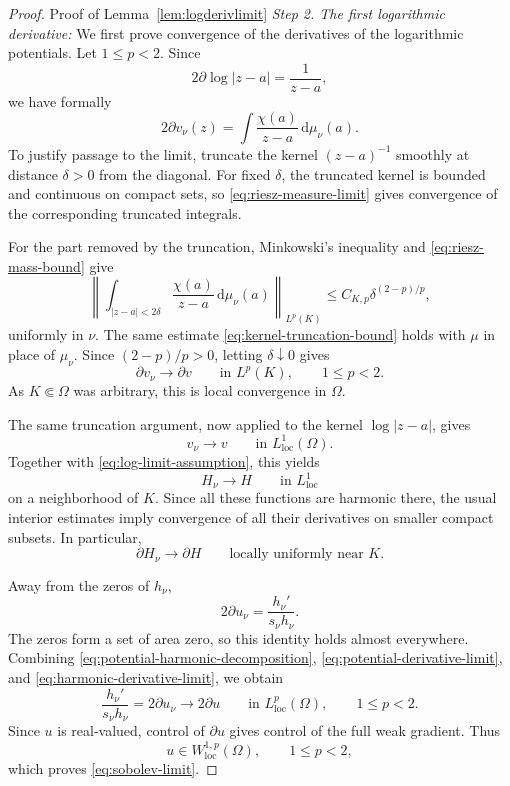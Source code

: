 \documentclass[12pt,letterpaper,reqno]{amsart}
\theoremstyle{definition}
\numberwithin{equation}{section}
\newcommand{\loc}{\mathrm{loc}}
\begin{document}
\begin{proof}{Proof of Lemma~\ref{lem:logderivlimit}}
\medskip\noindent
\emph{{Step 2. The first logarithmic derivative:}}
We first prove convergence of the derivatives of the logarithmic
potentials. Let \(1\leq p<2\). Since
\[
2\partial\log|z-a|=\frac1{z-a},
\]
we have formally
\[
2\partial v_\nu(z)
 =
 \int\frac{\chi(a)}{z-a}\,\mathrm d\mu_\nu(a).
\]
To justify passage to the limit, truncate the kernel
\((z-a)^{-1}\) smoothly at distance \(\delta>0\) from the diagonal.
For fixed \(\delta\), the truncated kernel is bounded and continuous
on compact sets, so \eqref{eq:riesz-measure-limit} gives convergence
of the corresponding truncated integrals.

For the part removed by the truncation, Minkowski's inequality and
\eqref{eq:riesz-mass-bound} give
\begin{equation}\label{eq:kernel-truncation-bound}
 \left\|
 \int_{|z-a|<2\delta}
 \frac{\chi(a)}{z-a}\,\mathrm d\mu_\nu(a)
 \right\|_{L^p(K)}
 \leq C_{K,p}\delta^{(2-p)/p},
\end{equation}
uniformly in \(\nu\). The same estimate
\eqref{eq:kernel-truncation-bound} holds with \(\mu\) in place of
\(\mu_\nu\). Since $(2-p)/p>0$, letting
\(\delta\downarrow0\) gives
\begin{equation}\label{eq:potential-derivative-limit}
 \partial v_\nu\longrightarrow\partial v
 \qquad\text{in }L^p(K),
 \qquad 1\leq p<2.
\end{equation}
As \(K\Subset\Omega\) was arbitrary, this is local convergence in
\(\Omega\).

The same truncation argument, now applied to the kernel
\(\log|z-a|\), gives
\[
v_\nu\longrightarrow v
\qquad\text{in }L^1_{\loc}(\Omega).
\]
Together with \eqref{eq:log-limit-assumption}, this yields
\begin{equation}\label{eq:harmonic-part-limit}
 H_\nu\longrightarrow H
 \qquad\text{in }L^1_{\loc}
\end{equation}
on a neighborhood of \(K\). Since all these functions are harmonic
there, the usual interior estimates imply convergence of all their
derivatives on smaller compact subsets. In particular,
\begin{equation}\label{eq:harmonic-derivative-limit}
 \partial H_\nu\longrightarrow\partial H
 \qquad\text{locally uniformly near }K.
\end{equation}

Away from the zeros of \(h_\nu\),
\[
2\partial u_\nu
 =
 \frac{h_\nu'}{s_\nu h_\nu}.
\]
The zeros form a set of area zero, so this identity holds almost
everywhere. Combining
\eqref{eq:potential-harmonic-decomposition},
\eqref{eq:potential-derivative-limit}, and
\eqref{eq:harmonic-derivative-limit}, we obtain
\begin{equation}\label{eq:first-logderiv-limit}
 \frac{h_\nu'}{s_\nu h_\nu}
 =
 2\partial u_\nu
 \longrightarrow
 2\partial u
 \qquad\text{in }L^p_{\loc}(\Omega),
 \qquad 1\leq p<2.
\end{equation}
Since \(u\) is real-valued, control of \(\partial u\) gives control of
the full weak gradient. Thus
\[
u\in W^{1,p}_{\loc}(\Omega),
\qquad
1\leq p<2,
\]
which proves \eqref{eq:sobolev-limit}.


\end{proof}
\end{document}
